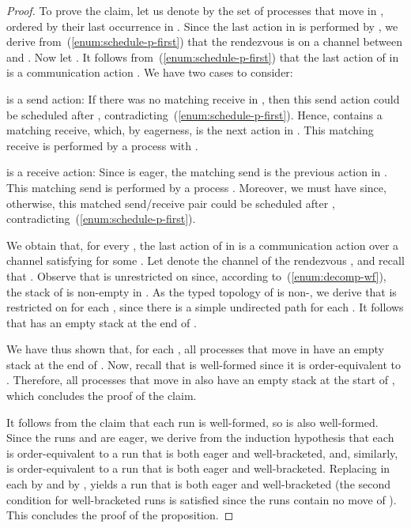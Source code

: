 \documentclass{LMCS}
\begin{document}
\begin{proof}
  To prove the claim, let us denote by 
  the set of processes that move in , ordered by their last
  occurrence in . 
  Since the last action in  is performed by , 
  we derive from~(\ref{enum:schedule-p-first}) that the rendezvous
   is on a channel between  and . 
  Now let .  It follows
  from~(\ref{enum:schedule-p-first}) that the last action of  in
   is a communication action .  We have two cases to
  consider: 
  \begin{iteMize}{}
  \item  is a send action: If there was no matching receive in , then this send action could be scheduled after , contradicting~(\ref{enum:schedule-p-first}).
    Hence,  contains a matching receive, which, by eagerness, is the next action in .
    This matching receive is performed by a process  with .
  \item  is a receive action: Since  is eager, the matching send is the previous action in .
    This matching send is performed by a process .
    Moreover, we must have  since, otherwise, this matched send/receive pair could be scheduled after , contradicting~(\ref{enum:schedule-p-first}).
  \end{iteMize}
  We obtain that, for every , the last action of 
  in  is a communication action over a channel 
  satisfying  for some .
  Let  denote the channel of the rendezvous , and recall that .
  Observe that  is unrestricted on  since, according to~(\ref{enum:decomp-wf}), the stack of  is non-empty in .
  As the typed topology of  is non-\converging, we derive that
   is restricted on  for each , since there
  is a simple undirected path  for each . 
It follows that  has an empty stack at the end of .


  We have thus shown that, for each , all processes
  that move in  have an empty stack at the end of .
  Now, recall that  is well-formed since it is order-equivalent
  to .  Therefore, all processes that move in  also have
  an empty stack at the start of , which concludes the proof
  of the claim.


  It follows from the claim that each run  is well-formed, so
   is also well-formed.  Since the runs
   and  are eager, we derive from the induction
  hypothesis that each  is order-equivalent to a run 
  that is both eager and well-bracketed, and, similarly,  is
  order-equivalent to a run  that is both eager and
  well-bracketed.  Replacing in  each  by  and
   by ,  yields a run  that is both eager and well-bracketed (the second condition
  for well-bracketed runs is satisfied since the runs  contain
  no move of ).  This concludes the
  proof of the proposition.
\end{proof}
\end{document}
